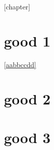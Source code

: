 \documentclass[12pt,hyperref,UTF8]{ctexbook}
\begin{document}
[chapter]
\renewcommand{\thetreeindexnumber}{
    \thechapter.\arabic{treeindexnumber}
}

\chapter{good 1}

\label{aabbccdd}
\ref{aabbccdd}

\chapter{good 2}

\chapter{good 3}
\end{document}
